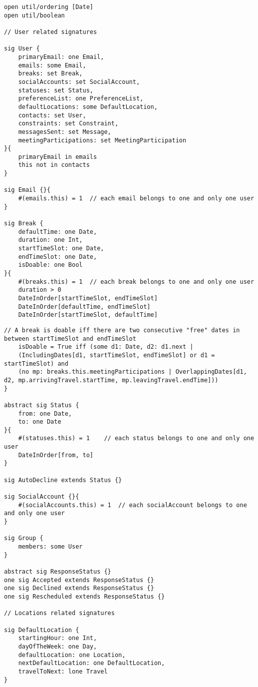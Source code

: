 

\begin{lstlisting}[style=alloy]
open util/ordering [Date]
open util/boolean

// User related signatures

sig User {
	primaryEmail: one Email,
	emails: some Email,
	breaks: set Break,
	socialAccounts: set SocialAccount,
	statuses: set Status,
	preferenceList: one PreferenceList,
	defaultLocations: some DefaultLocation,
	contacts: set User,
	constraints: set Constraint,
	messagesSent: set Message,
	meetingParticipations: set MeetingParticipation
}{
	primaryEmail in emails
	this not in contacts	
}

sig Email {}{
	#(emails.this) = 1	// each email belongs to one and only one user
}

sig Break {
	defaultTime: one Date,
	duration: one Int,
	startTimeSlot: one Date,
	endTimeSlot: one Date,
	isDoable: one Bool
}{
	#(breaks.this) = 1	// each break belongs to one and only one user
	duration > 0
	DateInOrder[startTimeSlot, endTimeSlot]
	DateInOrder[defaultTime, endTimeSlot]
	DateInOrder[startTimeSlot, defaultTime]
\end{lstlisting}
\clearpage
\begin{lstlisting}[style=alloy]
	// A break is doable iff there are two consecutive "free" dates in between startTimeSlot and endTimeSlot
	isDoable = True iff (some d1: Date, d2: d1.next |
	(IncludingDates[d1, startTimeSlot, endTimeSlot] or d1 = startTimeSlot) and 
	(no mp: breaks.this.meetingParticipations | OverlappingDates[d1, d2, mp.arrivingTravel.startTime, mp.leavingTravel.endTime]))
}

abstract sig Status {
	from: one Date,
	to: one Date
}{
	#(statuses.this) = 1	// each status belongs to one and only one user
	DateInOrder[from, to]
}

sig AutoDecline extends Status {}

sig SocialAccount {}{
	#(socialAccounts.this) = 1	// each socialAccount belongs to one and only one user
}

sig Group {
	members: some User
}

abstract sig ResponseStatus {}
one sig Accepted extends ResponseStatus {}
one sig Declined extends ResponseStatus {}
one sig Rescheduled extends ResponseStatus {}

// Locations related signatures

sig DefaultLocation {
	startingHour: one Int,
	dayOfTheWeek: one Day,
	defaultLocation: one Location,
	nextDefaultLocation: one DefaultLocation,
	travelToNext: lone Travel
}

\end{lstlisting}
